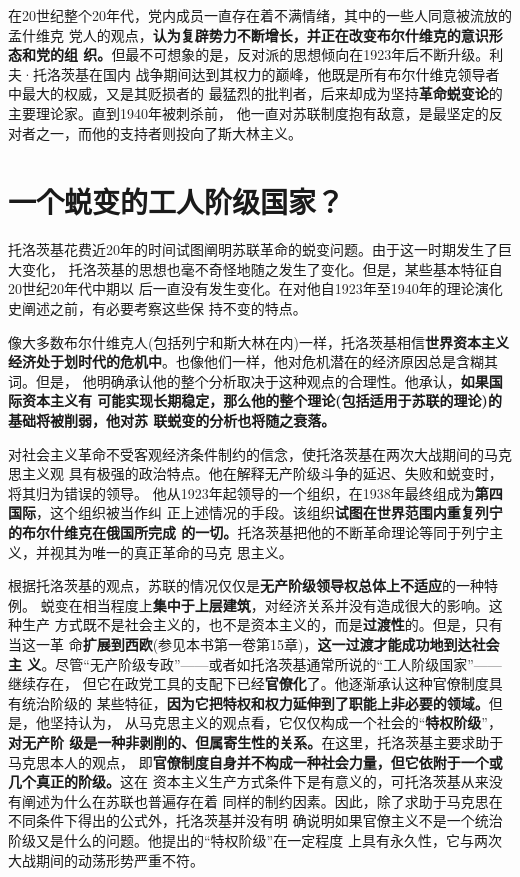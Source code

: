 在20世纪整个20年代，党内成员一直存在着不满情绪，其中的一些人同意被流放的孟什维克
党人的观点，\textbf{认为复辟势力不断增长，并正在改变布尔什维克的意识形态和党的组
  织。}但最不可想象的是，反对派的思想倾向在1923年后不断升级。利夫·托洛茨基在国内
战争期间达到其权力的巅峰，他既是所有布尔什维克领导者中最大的权威，又是其贬损者的
最猛烈的批判者，后来却成为坚持\textbf{革命蜕变论}的主要理论家。直到1940年被刺杀前，
他一直对苏联制度抱有敌意，是最坚定的反对者之一，而他的支持者则投向了斯大林主义。

\section{一个蜕变的工人阶级国家？}
托洛茨基花费近20年的时间试图阐明苏联革命的蜕变问题。由于这一时期发生了巨大变化，
托洛茨基的思想也毫不奇怪地随之发生了变化。但是，某些基本特征自20世纪20年代中期以
后一直没有发生变化。在对他自1923年至1940年的理论演化史阐述之前，有必要考察这些保
持不变的特点。

像大多数布尔什维克人(包括列宁和斯大林在内)一样，托洛茨基相信\textbf{世界资本主义
  经济处于划时代的危机中}。也像他们一样，他对危机潜在的经济原因总是含糊其词。但是，
他明确承认他的整个分析取决于这种观点的合理性。他承认，\textbf{如果国际资本主义有
  可能实现长期稳定，那么他的整个理论(包括适用于苏联的理论)的基础将被削弱，他对苏
  联蜕变的分析也将随之衰落。}

对社会主义革命不受客观经济条件制约的信念，使托洛茨基在两次大战期间的马克思主义观
具有极强的政治特点。他在解释无产阶级斗争的延迟、失败和蜕变时，将其归为错误的领导。
他从1923年起领导的一个组织，在1938年最终组成为\textbf{第四国际}，这个组织被当作纠
正上述情况的手段。该组织\textbf{试图在世界范围内重复列宁的布尔什维克在俄国所完成
  的一切。}托洛茨基把他的不断革命理论等同于列宁主义，并视其为唯一的真正革命的马克
思主义。

根据托洛茨基的观点，苏联的情况仅仅是\textbf{无产阶级领导权总体上不适应}的一种特例。
蜕变在相当程度上\textbf{集中于上层建筑}，对经济关系并没有造成很大的影响。这种生产
方式既不是社会主义的，也不是资本主义的，而是\textbf{过渡性}的。但是，只有当这一革
命\textbf{扩展到西欧}(参见本书第一卷第15章)，\textbf{这一过渡才能成功地到达社会主
  义}。尽管“无产阶级专政”——或者如托洛茨基通常所说的“工人阶级国家”——继续存在，
但它在政党工具的支配下已经\textbf{官僚化}了。他逐渐承认这种官僚制度具有统治阶级的
某些特征，\textbf{因为它把特权和权力延伸到了职能上非必要的领域。}但是，他坚持认为，
从马克思主义的观点看，它仅仅构成一个社会的“\textbf{特权阶级}”，\textbf{对无产阶
  级是一种非剥削的、但属寄生性的关系。}在这里，托洛茨基主要求助于马克思本人的观点，
即\textbf{官僚制度自身并不构成一种社会力量，但它依附于一个或几个真正的阶级。}这在
资本主义生产方式条件下是有意义的，可托洛茨基从来没有阐述为什么在苏联也普遍存在着
同样的制约因素。因此，除了求助于马克思在不同条件下得出的公式外，托洛茨基并没有明
确说明如果官僚主义不是一个统治阶级又是什么的问题。他提出的“特权阶级”在一定程度
上具有永久性，它与两次大战期间的动荡形势严重不符。

